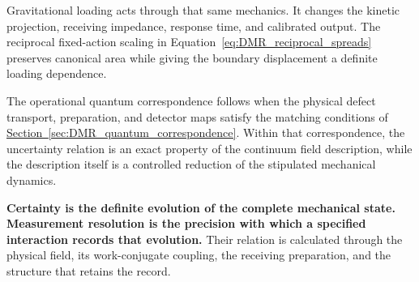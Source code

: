 Gravitational loading acts through that same mechanics. It changes the kinetic projection, receiving impedance, response time, and calibrated output. The reciprocal fixed-action scaling in Equation~\eqref{eq:DMR_reciprocal_spreads} preserves canonical area while giving the boundary displacement a definite loading dependence.

The operational quantum correspondence follows when the physical defect transport, preparation, and detector maps satisfy the matching conditions of \hyperref[sec:DMR_quantum_correspondence]{Section~\ref*{sec:DMR_quantum_correspondence}}. Within that correspondence, the uncertainty relation is an exact property of the continuum field description, while the description itself is a controlled reduction of the stipulated mechanical dynamics.

\noindent\textbf{Certainty is the definite evolution of the complete mechanical state. Measurement resolution is the precision with which a specified interaction records that evolution.} Their relation is calculated through the physical field, its work-conjugate coupling, the receiving preparation, and the structure that retains the record.
